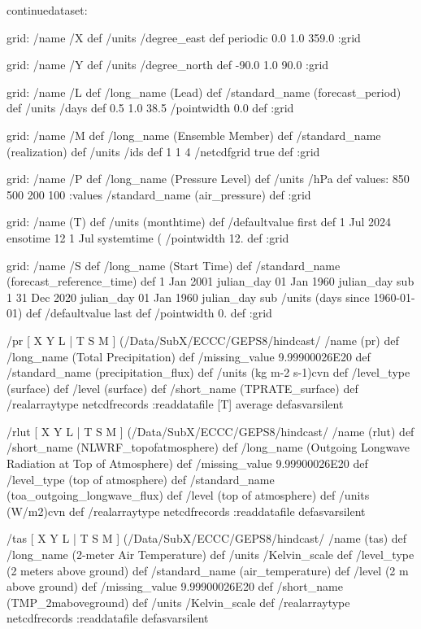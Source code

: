 \begin{ingrid}
continuedataset:

grid:
/name /X def
/units /degree_east def
periodic
 0.0 1.0 359.0
:grid

grid:
/name /Y def
/units /degree_north def
-90.0 1.0 90.0
:grid

grid:
/name /L def
/long_name (Lead) def
/standard_name (forecast_period) def
/units /days def
 0.5 1.0 38.5
/pointwidth 0.0 def
:grid

grid:
/name /M def
/long_name (Ensemble Member) def
/standard_name (realization) def
/units /ids def
1 1 4
/netcdfgrid true def
:grid

grid:
/name /P def
/long_name (Pressure Level) def
/units /hPa def
values: 850 500 200 100 :values
/standard_name (air_pressure) def
:grid

grid:
/name (T) def
/units (monthtime) def
/defaultvalue { first } def
1 Jul 2024 ensotime
12
1 Jul systemtime (%
/pointwidth 12. def
:grid



grid:
/name /S def
/long_name (Start Time) def
/standard_name (forecast_reference_time) def
1 Jan 2001 julian_day 01 Jan 1960 julian_day sub
1
31 Dec 2020 julian_day 01 Jan 1960 julian_day sub
/units (days since 1960-01-01) def
/defaultvalue { last } def
/pointwidth 0. def
:grid

 /pr{
[ X Y L | T S M ] (/Data/SubX/ECCC/GEPS8/hindcast/%
/name (pr) def
 /long_name (Total Precipitation) def
 /missing_value 9.99900026E20 def
 /standard_name (precipitation_flux) def
 /units (kg m-2 s-1)cvn def
 /level_type (surface) def
 /level (surface) def
 /short_name (TPRATE_surface) def
 /realarraytype netcdfrecords :readdatafile
 [T] average
}defasvarsilent

 /rlut{
[ X Y L | T S M ] (/Data/SubX/ECCC/GEPS8/hindcast/%
/name (rlut) def
 /short_name (NLWRF_topofatmosphere) def
 /long_name (Outgoing Longwave Radiation at Top of Atmosphere) def 
 /missing_value 9.99900026E20 def
 /level_type (top of atmosphere) def
 /standard_name (toa_outgoing_longwave_flux) def
 /level (top of atmosphere) def
 /units (W/m2)cvn def
 /realarraytype netcdfrecords :readdatafile
}defasvarsilent

 /tas{
[ X Y L | T S M ] (/Data/SubX/ECCC/GEPS8/hindcast/%
/name (tas) def
 /long_name (2-meter Air Temperature) def
 /units /Kelvin_scale def
 /level_type (2 meters above ground) def
 /standard_name (air_temperature) def
 /level (2 m above ground) def
 /missing_value 9.99900026E20 def
 /short_name (TMP_2maboveground) def
 /units /Kelvin_scale def
 /realarraytype netcdfrecords :readdatafile
}defasvarsilent


\end{ingrid}
